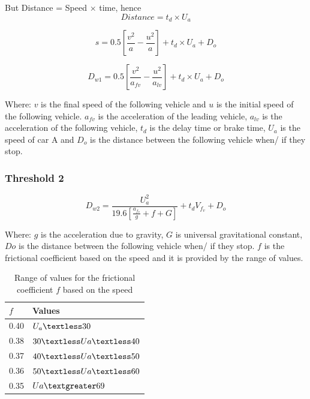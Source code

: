 \documentclass[12pt]{report}
\begin{document}
But Distance = Speed $\times$ time, hence
\begin{equation}
	Distance = t_d \times U_a
\end{equation}

\[s = 0.5 \left[ \frac{v^2}{a} - \frac{u^2}{a}\right] + t_d \times U_a + D_o\]

\begin{equation}
	{D_{w1}} = 0.5 \left[ \frac{v^2}{a_{fv}} - \frac{u^2}{a_{lv}}\right] + t_d \times U_a + D_o 
\end{equation}

Where: $v$ is the final speed of the following vehicle and $u$ is the initial speed of the following vehicle. $a_{fv}$ is the acceleration of the leading vehicle, $a_{lv}$ is the acceleration of the following vehicle, $t_d$ is the delay time or brake time, $U_a$ is the speed of car A and $D_o$ is the distance between the following vehicle when/ if they stop.

\subsubsection{Threshold 2}
\begin{equation}
	{D_{w2}} = \frac{U_a^2}{19.6 \left[ \frac{a_{f_v}}{g} + f + G \right]} + t_d {V_{f_v}} + D_o
\end{equation}


Where: $g$ is the acceleration due to gravity, $G$ is universal gravitational constant, $Do$ is the distance between the following vehicle when/ if they stop. 
$f$ is the frictional coefficient based on the speed and it is provided by the range of values.


\begin{table}[H]
	\caption{Range of values for the frictional coefficient $f$ based on the speed} %
	\centering %
	\begin{tabular}{| l | l |}
		\hline\hline
		$f$ & Values \\ \hline
		0.40 &  $U_a \textless 30$ \\ \hline
		0.38 &  $30 \textless Ua \textless 40$ \\ \hline
		0.37 &  $40 \textless Ua \textless 50$  \\ \hline	
		0.36 & 	$50 \textless Ua \textless 60$\\ \hline		
		0.35 & 	$Ua \textgreater 69$\\ \hline
	\end{tabular}
\end{table}
	 
\end{document}
